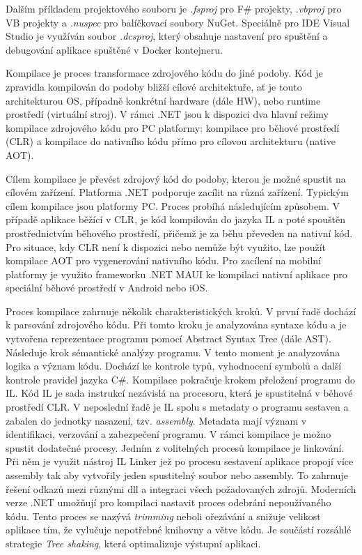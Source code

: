 Dalším příkladem projektového souboru je \emph{.fsproj} pro F\# projekty, \emph{.vbproj} pro VB projekty a \emph{.nuspec} pro balíčkovací soubory NuGet. Speciálně pro IDE Visual Studio je využíván soubor \emph{.dcsproj}, který obsahuje nastavení pro spuštění a debugování aplikace spuštěné v Docker kontejneru. 


Kompilace je proces transformace zdrojového kódu do jiné podoby. Kód je zpravidla kompilován do podoby bližší cílové architektuře, ať je touto architekturou OS, případně konkrétní hardware (dále HW), nebo runtime prostředí (virtuální stroj). \cite{Richter2012} V rámci .NET jsou k dispozici dva hlavní režimy kompilace zdrojového kódu pro PC platformy: kompilace pro běhové prostředí (CLR) a kompilace do nativního kódu přímo pro cílovou architekturu (native AOT).

Cílem kompilace je převést zdrojový kód do podoby, kterou je možné spustit na cílovém zařízení. Platforma .NET podporuje zacílit na různá zařízení. Typickým cílem kompilace jsou platformy PC. Proces probíhá následujícím způsobem. V případě aplikace běžící v CLR, je kód kompilován do jazyka IL a poté spouštěn prostřednictvím běhového prostředí, přičemž je za běhu převeden na nativní kód. \cite{Richter2012} Pro situace, kdy CLR není k dispozici nebo nemůže být využito, lze použít kompilace AOT pro vygenerování nativního kódu. \cite{Pflug2023} Pro zacílení na mobilní platformy je využito frameworku .NET MAUI ke kompilaci nativní aplikace pro speciální běhové prostředí v Android nebo iOS. \cite{Libery2023}


Proces kompilace zahrnuje několik charakteristických kroků. V první řadě dochází k parsování zdrojového kódu. Při tomto kroku je analyzována syntaxe kódu a je vytvořena reprezentace programu pomocí Abstract Syntax Tree (dále AST). Následuje krok sémantické analýzy programu. V tento moment je analyzována logika a význam kódu. Dochází ke kontrole typů, vyhodnocení symbolů a další kontrole pravidel jazyka C\#. Kompilace pokračuje krokem přeložení programu do IL. Kód IL je sada instrukcí nezávislá na procesoru, která je spustitelná v běhové prostředí CLR. \cite{Richter2012} V neposlední řadě je IL spolu s metadaty o programu sestaven a zabalen do jednotky nasazení, tzv. \emph{assembly}.  Metadata mají význam v identifikaci, verzování a zabezpečení programu. V rámci kompilace je možno spustit dodatečné procesy. Jedním z volitelných procesů kompilace je linkování. Při něm je využit nástroj IL Linker jež po procesu sestavení aplikace propojí více assembly tak aby vytvořily jeden spustitelný soubor nebo assembly. \cite{Bock2016} To zahrnuje řešení odkazů mezi různými dll a integraci všech požadovaných zdrojů. Moderních verze .NET umožňují pro kompilaci nastavit proces odebrání nepoužívaného kódu. Tento proces se nazývá \emph{trimming} neboli ořezávání a snižuje velikost aplikace tím, že vylučuje nepotřebné knihovny a větve kódu. \cite{Price2023c8} Je součástí rozsáhlé strategie \emph{Tree shaking}, která optimalizuje výstupní aplikaci.

